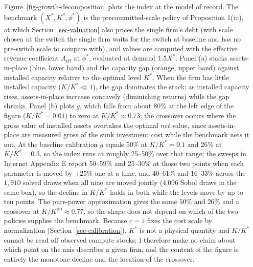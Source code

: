 \documentclass[
  11pt,
  letterpaper,
]{scrartcl}
\begin{document}
Figure~\ref{fig-growth-decomposition} plots the index at the model of
record. The benchmark \((X^*, K^*, \phi^*)\) is the precommitted-scale
policy of Proposition 1(iii), at which Section~\ref{sec-valuation} also
prices the single firm's debt (with scale chosen at the switch the
single firm waits for the switch at baseline and has no pre-switch scale
to compare with), and values are computed with the effective revenue
coefficient \(A_{\text{eff}}\) at \(\phi^*\), evaluated at demand
\(1.5 X^*\). Panel (a) stacks assets-in-place (blue, lower band) and the
capacity gap (orange, upper band) against installed capacity relative to
the optimal level \(K^*\). When the firm has little installed capacity
(\(K/K^* \ll 1\)), the gap dominates the stack; as installed capacity
rises, assets-in-place increase concavely (diminishing returns) while
the gap shrinks. Panel (b) plots \(g\), which falls from about 80\% at
the left edge of the figure (\(K/K^* = 0.01\)) to zero at
\(K/K^* \approx 0.73\); the crossover occurs where the gross value of
installed assets overtakes the optimal \emph{net} value, since
assets-in-place are measured gross of the sunk investment cost while the
benchmark nets it out. At the baseline calibration \(g\) equals 50\% at
\(K/K^* = 0.1\) and 26\% at \(K/K^* = 0.3\), so the index runs at
roughly 25--50\% over that range; the sweeps in Internet Appendix E
report 50--59\% and 25--30\% at those two points when each parameter is
moved by \(\pm 25\%\) one at a time, and 40--61\% and 16--33\% across
the \(1{,}910\) solved draws when all nine are moved jointly (4,096
Sobol draws in the same box), so the decline in \(K/K^*\) holds in both
while the levels move by up to ten points. The pure-power approximation
gives the same \(50\%\) and \(26\%\) and a crossover at
\(K/K^{\text{pp}} \approx 0.77\), so the shape does not depend on which
of the two policies supplies the benchmark. Because \(c = 1\) fixes the
cost scale by normalization (Section~\ref{sec-calibration}), \(K^*\) is
not a physical quantity and \(K/K^*\) cannot be read off observed
compute stocks; I therefore make no claim about which point on the axis
describes a given firm, and the content of the figure is entirely the
monotone decline and the location of the crossover.
\end{document}
